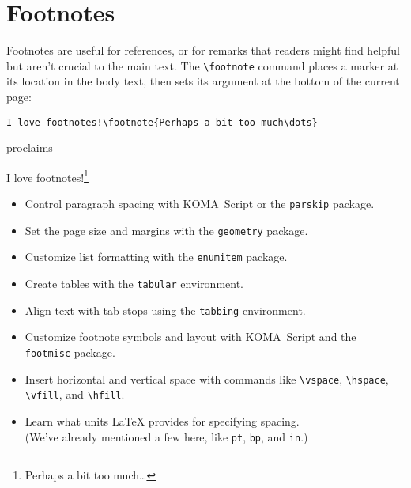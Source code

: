 \section{Footnotes}

Footnotes are useful for references,
or for remarks that readers might find helpful
but aren't crucial to the main text.
The \verb|\footnote| command places a marker at its location in the
body text, then sets its argument at the bottom of the current
page:
\begin{leftfigure}
\begin{lstlisting}
I love footnotes!\footnote{Perhaps a bit too much\dots}
\end{lstlisting}
\end{leftfigure}
proclaims
\begin{leftfigure}
\lm%
I love footnotes!\footnote{Perhaps a bit too much\dots}
\end{leftfigure}

\exercises{}
\begin{itemize}
\item Control paragraph spacing with KOMA~Script or the \texttt{parskip} package.
\item Set the page size and margins with the \texttt{geometry} package.
\item Customize list formatting with the \texttt{enumitem} package.
\item Create tables with the \texttt{tabular} environment.
\item Align text with tab stops using the \texttt{tabbing} environment.
\item Customize footnote symbols and layout with KOMA~Script and the
    \texttt{footmisc} package.
\item Insert horizontal and vertical space with commands like
    \verb|\vspace|, \verb|\hspace|, \verb|\vfill|, and \verb|\hfill|.
\item Learn what units \LaTeX{} provides for specifying spacing. \\
    (We've already mentioned a few here, like
    \texttt{pt}, \texttt{bp}, and \texttt{in}.)
\end{itemize}
